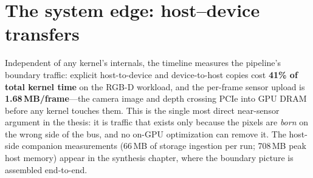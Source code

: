 \section{The system edge: host--device transfers}
\label{sec:char-transfers}

Independent of any kernel's internals, the timeline measures the pipeline's
boundary traffic: explicit host-to-device and device-to-host copies cost
\textbf{41\% of total kernel time} on the RGB-D workload, and the
per-frame sensor upload is \textbf{1.68\,MB/frame}---the camera image and
depth crossing PCIe into GPU DRAM before any kernel touches them. This is
the single most direct near-sensor argument in the thesis: it is traffic
that exists only because the pixels are \emph{born} on the wrong side of the
bus, and no on-GPU optimization can remove it. The host-side companion
measurements (66\,MB of storage ingestion per run; 708\,MB peak host memory)
appear in the synthesis chapter, where the boundary picture is assembled
end-to-end.

